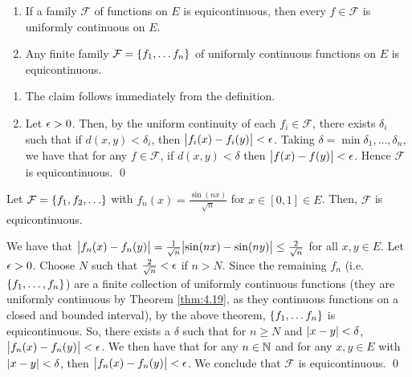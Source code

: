 \begin{ntheorem}{}{}
    \begin{enumerate}
        \item If a family $\mathcal{F}$ of functions on $E$ is equicontinuous, then every $f \in \mathcal{F}$ is uniformly continuous on $E$.
        \item Any finite family $\mathcal{F} = \set{f_1, \ldots f_n}$ of uniformly continuous functions on $E$ is equicontinuous.
    \end{enumerate}
\end{ntheorem}
\begin{nproof}
    \begin{enumerate}
        \item The claim follows immediately from the definition.
        \item Let $\epsilon > 0$. Then, by the uniform continuity of each $f_i \in \mathcal{F}$, there exists $\delta_i$ such that if $d(x, y) < \delta_i$, then $\abs{f_i(x) - f_i(y)} < \epsilon$. Taking $\delta = \min{\delta_1, \ldots, \delta_n}$, we have that for any $f \in \mathcal{F}$, if $d(x, y) < \delta$ then $\abs{f(x) - f(y)} < \epsilon$. Hence $\mathcal{F}$ is equicontinuous. \qed
    \end{enumerate}
\end{nproof}

\begin{nexample}{}{}
    Let $\mathcal{F} = \set{f_1, f_2, \ldots}$ with $f_n(x) = \frac{\sin (nx)}{\sqrt{n}}$ for $x \in [0, 1] \in E$. Then, $\mathcal{F}$ is equicontinuous.
\end{nexample}
\begin{nproof}
    We have that $\abs{f_n(x) - f_n(y)} = \frac{1}{\sqrt{n}}\abs{\sin(nx) - \sin(ny)} \leq \frac{2}{\sqrt{n}}$ for all $x, y \in E$. Let $\epsilon > 0$. Choose $N$ such that $\frac{2}{\sqrt{n}} < \epsilon$ if $n > N$. Since the remaining $f_n$ (i.e. $\set{f_1, \ldots, f_{n}}$) are a finite collection of uniformly continuous functions (they are uniformly continuous by Theorem \ref{thm:4.19}, as they continuous functions on a closed and bounded interval), by the above theorem, $\set{f_1, \ldots f_{n}}$ is equicontinuous. So, there exists a $\delta$ such that for $n \geq N$ and $\abs{x - y} < \delta$, $\abs{f_n(x) - f_n(y)} < \epsilon$. We then have that for any $n \in \mathbb{N}$ and for any $x, y \in E$ with $\abs{x - y} < \delta$, then $\abs{f_n(x) - f_n(y)} < \epsilon$. We conclude that $\mathcal{F}$ is equicontinuous. \qed
\end{nproof}

